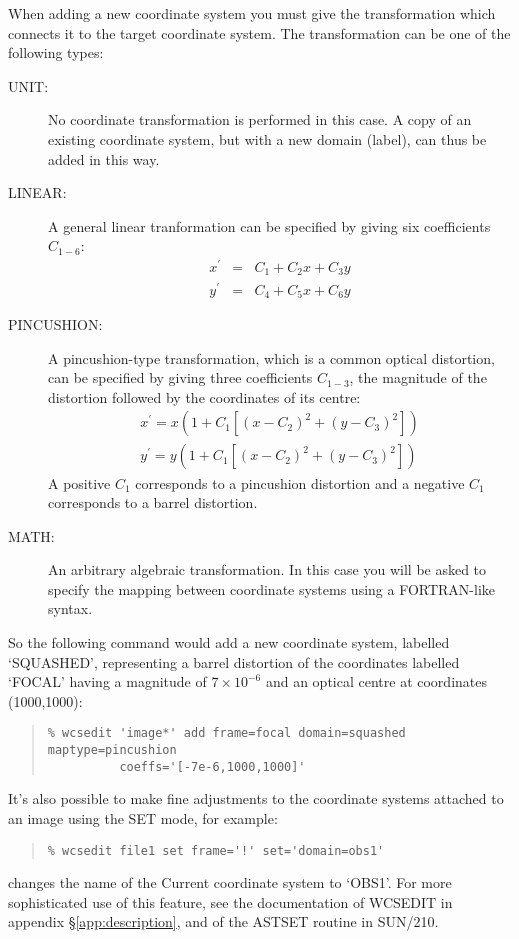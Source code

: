 \documentclass[twoside,11pt]{article}
\newcommand{\htmlref}[2]{#1}
\newcommand{\xref}[3]{#1}
\renewcommand{\_}{\texttt{\symbol{95}}}
\newenvironment{myquote}{\begin{quote}\begin{small}}{\end{small}\end{quote}}
\newcommand{\xroutine}[1]{\htmlref{{\sc #1}}{#1}}
\begin{document}
When adding a new 
coordinate system you must give the transformation which connects it 
to the target coordinate system.
The transformation can be one of the following types:
\begin{description}
\item[UNIT:]
No coordinate transformation is performed in this case.
A copy of an existing coordinate system, but with a new domain (label),
can thus be added in this way.
\item[LINEAR:]
A general linear tranformation can be specified by giving six
coefficients $C_{1-6}$:
\begin{eqnarray*}
   x^\prime & = & C_1 + C_2 x + C_3 y \\
   y^\prime & = & C_4 + C_5 x + C_6 y
\end{eqnarray*}
\item[PINCUSHION:]
A pincushion-type transformation,
which is a common optical distortion,
can be specified by giving three coefficients $C_{1-3}$, 
the magnitude of the distortion followed by the coordinates of its centre:
\begin{eqnarray*}
   x^\prime = x \left( 1 + C_1  \left[ \left( x - C_2 \right)^2 
                                     + \left( y - C_3 \right)^2 \right] \right)
   \\
   y^\prime = y \left( 1 + C_1  \left[ \left( x - C_2 \right)^2 
                                     + \left( y - C_3 \right)^2 \right] \right)
\end{eqnarray*}
A positive $C_1$ corresponds to a pincushion distortion and 
a negative $C_1$ corresponds to a barrel distortion.
\item[MATH:]
An arbitrary algebraic transformation.
In this case you will be asked to specify the mapping between coordinate
systems using a FORTRAN-like syntax.
\end{description}
So the following command would 
add a new coordinate system, labelled `SQUASHED', 
representing a barrel distortion of the coordinates labelled `FOCAL' 
having a magnitude of $7\times 10^{-6}$ 
and an optical centre at coordinates (1000,1000):
\begin{myquote}
\begin{verbatim}
% wcsedit 'image*' add frame=focal domain=squashed maptype=pincushion 
          coeffs='[-7e-6,1000,1000]'
\end{verbatim}
\end{myquote}

It's also possible to make fine adjustments to the coordinate
systems attached to an image using the SET mode, for example:
\begin{myquote}
\begin{verbatim}
% wcsedit file1 set frame='!' set='domain=obs1'
\end{verbatim}
\end{myquote}
changes the name of the Current coordinate system to `OBS1'.
For more sophisticated use of this feature, see the documentation
of \xroutine{WCSEDIT} in appendix \S\ref{app:description}, and of
the \xref{AST\_SET}{sun210}{AST\_SET} routine in \xref{SUN/210}{sun210}{}.
\end{document}
